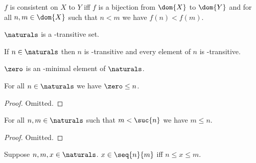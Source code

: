 \begin{definition}\label{bijection_of_urysohnchains}
    $f$ is consistent on $X$ to $Y$ iff $f$ is a bijection from $\dom{X}$ to $\dom{Y}$ and for all $n,m \in \dom{X}$ such that $n < m$ we have $f(n) < f(m)$.
\end{definition}

\begin{proposition}\label{naturals_in_transitive}
    $\naturals$ is a \in-transitive set.
\end{proposition}

\begin{proposition}\label{naturals_elem_in_transitive}
    If $n \in \naturals$ then $n$ is \in-transitive and every element of $n$ is \in-transitive. 
\end{proposition}

\begin{proposition}\label{zero_is_in_minimal}
    $\zero$ is an \in-minimal element of $\naturals$.
\end{proposition}

\begin{proposition}\label{naturals_leq}
    For all $n \in \naturals$ we have $\zero \leq n$.
\end{proposition}
\begin{proof}
    Omitted.
\end{proof}

\begin{proposition}\label{naturals_leq_on_suc}
    For all $n,m \in \naturals$ such that $m < \suc{n}$ we have $m \leq n$.
\end{proposition}
\begin{proof}
    Omitted.
\end{proof}

\begin{proposition}\label{x_in_seq_iff}
    Suppose $n,m,x \in \naturals$.
    $x \in \seq{n}{m}$ iff $n \leq x \leq m$.
\end{proposition}

